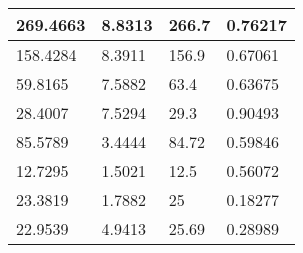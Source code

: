 \begin{tabular}{|l|l|l|l|}
\hline
269.4663&8.8313&266.7&0.76217\\\hline
158.4284&8.3911&156.9&0.67061\\\hline
59.8165&7.5882&63.4&0.63675\\\hline
28.4007&7.5294&29.3&0.90493\\\hline
85.5789&3.4444&84.72&0.59846\\\hline
12.7295&1.5021&12.5&0.56072\\\hline
23.3819&1.7882&25&0.18277\\\hline
22.9539&4.9413&25.69&0.28989\\\hline
\end{tabular}
